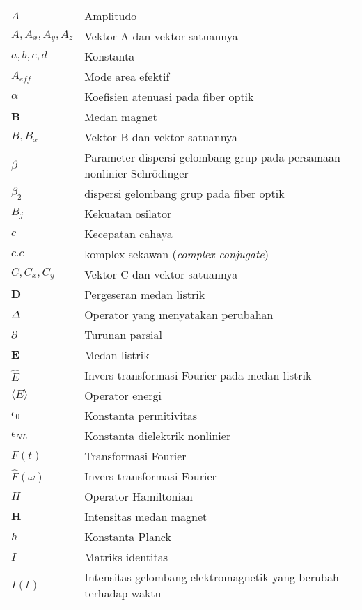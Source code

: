 \vspace{1.5pc}
\vspace{1.5pc}
\begin{center}
\begin{tabular}{lp{}}
  $A$ & Amplitudo \\
  $A,A_x,A_y,A_z$ & Vektor A dan vektor satuannya \\
  $a,b,c,d$ & Konstanta \\
  $A_{eff}$ & Mode area efektif \\
  $\alpha$ & Koefisien atenuasi pada fiber optik\\
  $\mathbf{B}$ & Medan magnet \\
  $B,B_x$ & Vektor B dan vektor satuannya\\
  $\beta$ & Parameter dispersi gelombang grup pada persamaan nonlinier Schr\"odinger \\
  $\beta_2$ & dispersi gelombang grup pada fiber optik\\
  $B_j$ & Kekuatan osilator\\
  $c$ & Kecepatan cahaya\\
    $c.c$ & komplex sekawan (\textit{complex conjugate})\\
  $C,C_x,C_y$ & Vektor C dan vektor satuannya\\
  $\mathbf{D}$ & Pergeseran medan listrik\\
  $\Delta$ & Operator yang menyatakan perubahan\\
  $\partial$ & Turunan parsial\\
  $\mathbf{E}$ & Medan listrik\\
  $\hat{E}$ & Invers transformasi Fourier pada medan listrik\\
  $\langle E\rangle$ & Operator energi\\
  $\epsilon_0$ & Konstanta permitivitas\\
  $\epsilon_{NL}$ & Konstanta dielektrik nonlinier\\
  $F(t)$ & Transformasi Fourier\\
  $\hat{F}(\omega)$ & Invers transformasi Fourier\\
  $H$ & Operator Hamiltonian\\
    $\mathbf{H}$ & Intensitas medan magnet\\
      $h$ & Konstanta Planck\\
  $I$ & Matriks identitas\\
    $\bar{I}(t)$ & Intensitas gelombang elektromagnetik yang berubah terhadap waktu\\

\end{tabular}
\end{center}
